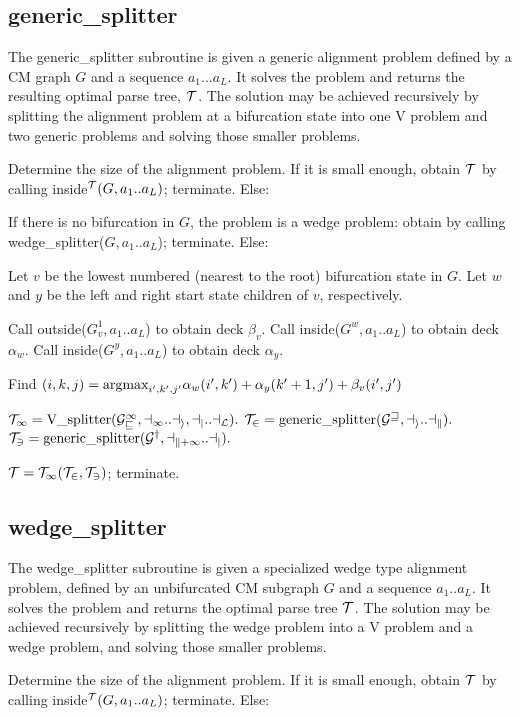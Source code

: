 \documentclass[11pt]{article}
\def\argmax{\mbox{\rm{argmax}}}      %
\begin{document}
\subsection{generic\_splitter}

The generic\_splitter subroutine is given a generic alignment problem
defined by a CM graph $G$ and a sequence $a_1...a_L$. It solves the
problem and returns the resulting optimal parse tree, $\cal{T}$. The
solution may be achieved recursively by splitting the alignment
problem at a bifurcation state into one V problem and two generic
problems and solving those smaller problems.

Determine the size of the alignment problem. If it is small enough,
obtain $\cal{T}$ by calling inside$^{\cal{T}}(G, a_1..a_L)$;
terminate.  Else:

If there is no bifurcation in $G$, the problem is a wedge problem:
obtain  by calling wedge\_splitter($G, a_1..a_L$); terminate.
Else:

Let $v$ be the lowest numbered (nearest to the root) bifurcation state
in $G$. Let $w$ and $y$ be the left and right start state children of
$v$, respectively.

Call outside($G^1_v, a_1..a_L$) to obtain deck $\beta_v$.
Call inside($G^w, a_1..a_L$)    to obtain deck $\alpha_w$.
Call inside($G^y, a_1..a_L$)    to obtain deck $\alpha_y$.

Find $(i,k,j) = \argmax_{i',k',j'} \alpha_w(i',k') + \alpha_y(k'+1,j') + \beta_v(i',j')$ 

$\cal{T}_1 = \mbox{V\_splitter}(G^1_v, a_1..a_i, a_j..a_L).$
$\cal{T}_2 = \mbox{generic\_splitter}(G^w, a_i..a_k).$
$\cal{T}_3 = \mbox{generic\_splitter}(G^y, a_{k+1}..a_j).$

$\cal{T} = \cal{T}_1 (\cal{T}_2, \cal{T}_3)$; terminate.

\subsection{wedge\_splitter}

The wedge\_splitter subroutine is given a specialized wedge type
alignment problem, defined by an unbifurcated CM subgraph $G$ and a
sequence $a_1..a_L$. It solves the problem and returns the optimal
parse tree $\cal{T}$. The solution may be achieved recursively by
splitting the wedge problem into a V problem and a wedge problem, and
solving those smaller problems.

Determine the size of the alignment problem. If it is small enough,
obtain $\cal{T}$ by calling inside$^{\cal{T}}(G, a_1..a_L)$;
terminate. Else:
\end{document}
